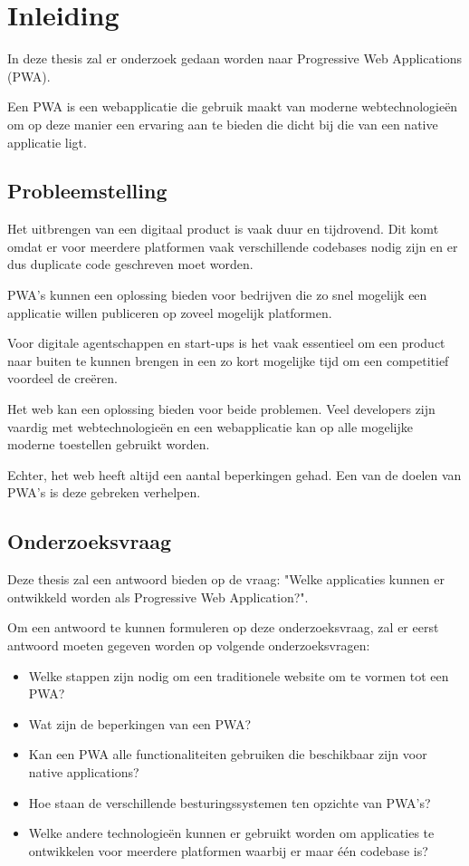 
\chapter{Inleiding}
\label{ch:inleiding}

In deze thesis zal er onderzoek gedaan worden naar Progressive Web Applications (PWA).

Een PWA is een webapplicatie die gebruik maakt van moderne webtechnologieën om op deze manier een ervaring aan te bieden die dicht bij die van een native applicatie ligt.

\section{Probleemstelling}

	Het uitbrengen van een digitaal product is vaak duur en tijdrovend. Dit komt omdat er voor meerdere platformen vaak verschillende codebases nodig zijn en er dus duplicate code geschreven moet worden. 
	
	PWA's kunnen een oplossing bieden voor bedrijven die zo snel mogelijk een applicatie willen publiceren op zoveel mogelijk platformen.
	
	Voor digitale agentschappen en start-ups is het vaak essentieel om een product naar buiten te kunnen brengen in een zo kort mogelijke tijd om een competitief voordeel de creëren. 
	
	Het web kan een oplossing bieden voor beide problemen. Veel developers zijn vaardig met webtechnologieën en een webapplicatie kan op alle mogelijke moderne toestellen gebruikt worden. 
	
	Echter, het web heeft altijd een aantal beperkingen gehad. Een van de doelen van PWA's is deze gebreken verhelpen.


\section{Onderzoeksvraag}


	Deze thesis zal een antwoord bieden op de vraag: "Welke applicaties kunnen er ontwikkeld worden als Progressive Web Application?".
	
	Om een antwoord te kunnen formuleren op deze onderzoeksvraag, zal er eerst antwoord moeten gegeven worden op volgende onderzoeksvragen:
	
	\begin{itemize}
		  \item Welke stappen zijn nodig om een traditionele website om te vormen tot een PWA?
		  \item Wat zijn de beperkingen van een PWA?
		  \item Kan een PWA alle functionaliteiten gebruiken die beschikbaar zijn voor native applications?
		  \item Hoe staan de verschillende besturingssystemen ten opzichte van PWA's?
		  \item Welke andere technologieën kunnen er gebruikt worden om applicaties te ontwikkelen voor meerdere platformen waarbij er maar één codebase is?
	  \end{itemize}

